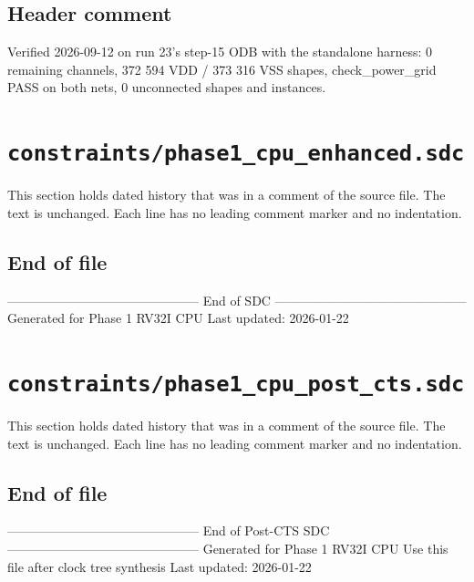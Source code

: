 \begin{record}

\subsection*{Header comment}

\begin{textblock}
Verified 2026-09-12 on run 23's step-15 ODB with the standalone harness:
  0 remaining channels, 372 594 VDD / 373 316 VSS shapes,
  check_power_grid PASS on both nets, 0 unconnected shapes and instances.

\end{textblock}

\end{record}

\section{\texttt{constraints/phase1\_cpu\_enhanced.sdc}}\label{cr:pd:phase1-cpu-enhanced-sdc}

This section holds dated history that was in a comment of the source file. The text is unchanged. Each line has no leading comment marker and no indentation.

\begin{record}

\subsection*{End of file}

\begin{textblock}
---------------------------------------------
End of SDC
---------------------------------------------
Generated for Phase 1 RV32I CPU
Last updated: 2026-01-22
\end{textblock}

\end{record}

\section{\texttt{constraints/phase1\_cpu\_post\_cts.sdc}}\label{cr:pd:phase1-cpu-post-cts-sdc}

This section holds dated history that was in a comment of the source file. The text is unchanged. Each line has no leading comment marker and no indentation.

\begin{record}

\subsection*{End of file}

\begin{textblock}
---------------------------------------------
End of Post-CTS SDC
---------------------------------------------
Generated for Phase 1 RV32I CPU
Use this file after clock tree synthesis
Last updated: 2026-01-22
\end{textblock}

\end{record}

